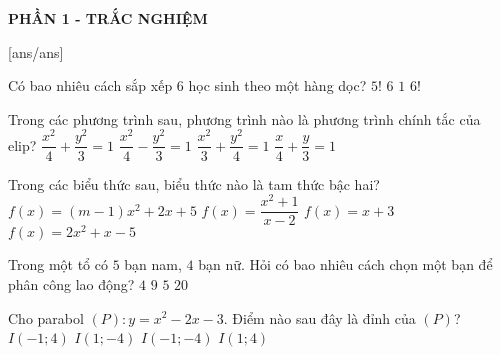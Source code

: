 
\begin{center}
	\textbf{PHẦN 1 - TRẮC NGHIỆM}
\end{center}
[ans/ans]
%
\begin{ex}%
 Có bao nhiêu cách sắp xếp $6$ học sinh theo một hàng dọc? 
	\choice
	{$5!$}
	{$6$}
	{$1$}
	{\True $6!$}
\end{ex}

\begin{ex}%
Trong các phương trình sau, phương trình nào là phương trình chính tắc của elip? 
	\choice
	{\True $\dfrac{x^2}{4}+\dfrac{y^2}{3}=1$}
	{$\dfrac{x^2}{4}-\dfrac{y^2}{3}=1$}
	{$\dfrac{x^2}{3}+\dfrac{y^2}{4}=1$}
	{$\dfrac{x}{4}+\dfrac{y}{3}=1$}
\end{ex}

\begin{ex}%
Trong các biểu thức sau, biểu thức nào là tam thức bậc hai?
	\choice
	{$f(x)=(m-1)x^2+2 x+5$}
	{$f(x)=\dfrac{x^2+1}{x-2}$}
	{$f(x)=x+3$}
	{\True $f(x)=2x^2+x-5$}
\end{ex}

\begin{ex}%
Trong một tổ có $5$ bạn nam, $4$ bạn nữ. Hỏi có bao nhiêu cách chọn một bạn để phân công lao động? 
	\choice
	{$4$}
	{\True $9$}
	{$5$}
	{$20$}
\end{ex}

\begin{ex}%
Cho parabol $(P)\colon y=x^2-2x-3$. Điểm nào sau đây là đỉnh của $(P)$? 
	\choice
	{$I(-1 ; 4)$}
	{\True $I(1 ;-4)$}
	{$I(-1 ;-4)$}
	{$I(1 ; 4)$}
\end{ex}

